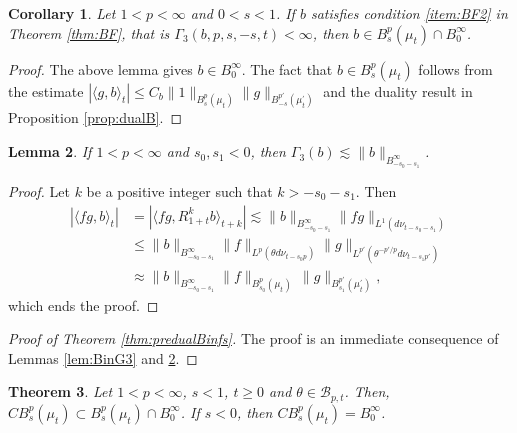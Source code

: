\documentclass[12pt,twoside,leqno,final]{amsart}
\theoremstyle{plain}
\newtheorem{thm}{Theorem}[section]
\newtheorem{lem}[thm]{Lemma}
\newtheorem{cor}[thm]{Corollary}
\begin{document}
\begin{cor} \label{cor:Bloch} 
Let $1<p<\infty$ and $0<s<1$. 
If $b$ satisfies condition \eqref{item:BF2} in Theorem \ref{thm:BF}, that is $\Gamma_3(b,p,s,-s,t)<\infty$, then 
$b\in B^p_{s}(\mu_t)\cap B^\infty_0$.
\end{cor}

\begin{proof}
The above lemma gives $b\in B^\infty_0$. 
The fact that $b\in B^p_s(\mu_t)$ follows from the estimate 
$
|\langle g,b\rangle_t|\le C_b \|1\|_{B^p_s(\mu_t)}\|g\|_{B^{p'}_{-s}(\mu^\prime_t)}
$
and the duality result in Proposition \ref{prop:dualB}.
\end{proof}

\begin{lem} \label{lem:G3inB}
If $1<p<\infty$ and $s_0,s_1<0$, then $\Gamma_3(b)\lesssim \|b\|_{B^\infty_{-s_0-s_1}}$.
\end{lem}

\begin{proof}
Let $k$ be a positive integer such that $k>-s_0-s_1$. Then
\begin{align*}
|\langle fg,b\rangle_t|&=|\langle fg,R^k_{1+t}b\rangle_{t+k}|
\lesssim \|b\|_{B^\infty_{-s_0-s_1}}\|fg\|_{L^1(d\nu_{t-s_0-s_1})}\\
&\le \|b\|_{B^\infty_{-s_0-s_1}}\|f\|_{L^p(\theta d\nu_{t-s_0p})}\|g\|_{L^{p'}(\theta^{-p'/p} d\nu_{t-s_1p'})}\\
&\approx \|b\|_{B^\infty_{-s_0-s_1}}\|f\|_{B^p_{s_0}(\mu_t)}\,\|g\|_{B^{p'}_{s_1}(\mu^\prime_t)}, 
\end{align*} 
which ends the proof.
\end{proof}

\begin{proof}[Proof of Theorem \ref{thm:predualBinfs}]
The proof is an immediate consequence of Lemmas \ref{lem:BinG3} and \ref{lem:G3inB}.
\end{proof}

\begin{thm}\label{thm:normCB}
Let $1<p<\infty$, $s<1$, $t\ge 0$ and $\theta\in {{\mathcal B}}_{p,t}$. Then, $CB^p_s(\mu_t)\subset B^p_s(\mu_t)\cap B^\infty_0$. 
If $s<0$, then $CB^p_s(\mu_t)=B^\infty_0$.
\end{thm}
\end{document}
